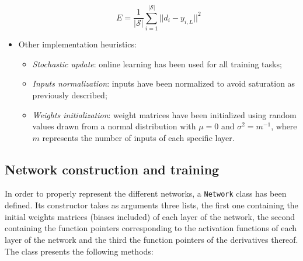 \documentclass[letterpaper,headings=standardclasses]{scrartcl}
\begin{document}
\begin{itemize}
    $$ E = \frac{1}{|\mathcal{S}|} \sum_{i = 1}^{|\mathcal{S}|} || d_i - y_{i,L} ||^2 $$
    
    \item Other implementation heuristics:
    
    \begin{itemize}
        \item \emph{Stochastic update}: online learning has been used for all training tasks;
        \item \emph{Inputs normalization}: inputs have been normalized to avoid saturation as previously described;
        \item \emph{Weights initialization}: weight matrices have been initialized using random values drawn from a normal distribution with $\mu = 0$ and $\sigma^2 = m^{-1}$, where $m$ represents the number of inputs of each specific layer.
    \end{itemize}

\end{itemize}

\subsection{Network construction and training}

In order to properly represent the different networks, a \texttt{Network} class has been defined. Its constructor takes as arguments three lists, the first one containing the initial weights matrices (biases included) of each layer of the network, the second containing the function pointers corresponding to the activation functions of each layer of the network and the third the function pointers of the derivatives thereof. The class presents the following methods:
\end{document}
